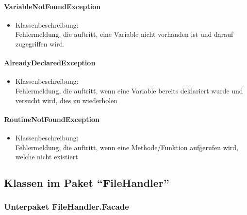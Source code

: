 \documentclass[parskip=full]{scrartcl}
\begin{document}
\paragraph{VariableNotFoundException}
\begin{itemize}
\item Klassenbeschreibung: \\
Fehlermeldung, die auftritt, eine Variable nicht vorhanden ist und darauf zugegriffen wird.
\end{itemize}

\paragraph{AlreadyDeclaredException}
\begin{itemize}
\item Klassenbeschreibung: \\
Fehlermeldung, die auftritt, wenn eine Variable bereits deklariert wurde und versucht wird, dies zu wiederholen
\end{itemize}

\paragraph{RoutineNotFoundException}
\begin{itemize}
\item Klassenbeschreibung: \\
Fehlermeldung, die auftritt, wenn eine Methode/Funktion aufgerufen wird, welche nicht existiert
\end{itemize}

\subsection{Klassen im Paket \enquote{FileHandler}}

\subsubsection{Unterpaket FileHandler.Facade}
\end{document}
